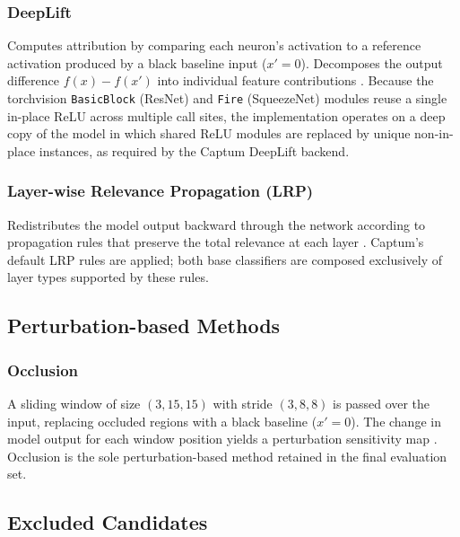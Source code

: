 \subsubsection{DeepLift}
Computes attribution by comparing each neuron's activation to a reference
activation produced by a black baseline input ($x' = 0$). Decomposes the
output difference $f(x) - f(x')$ into individual feature contributions
\cite{shrikumar2017deeplift}. Because the torchvision \texttt{BasicBlock}
(ResNet) and \texttt{Fire} (SqueezeNet) modules reuse a single in-place
ReLU across multiple call sites, the implementation operates on a deep
copy of the model in which shared ReLU modules are replaced by unique
non-in-place instances, as required by the Captum DeepLift backend.

\subsubsection{Layer-wise Relevance Propagation (LRP)}
Redistributes the model output backward through the network according to
propagation rules that preserve the total relevance at each layer
\cite{bach2015lrp}. Captum's default LRP rules are applied; both base
classifiers are composed exclusively of layer types supported by these
rules.

\subsection{Perturbation-based Methods}

\subsubsection{Occlusion}
A sliding window of size $(3, 15, 15)$ with stride $(3, 8, 8)$ is passed
over the input, replacing occluded regions with a black baseline ($x' = 0$).
The change in model output for each window position yields a perturbation
sensitivity map \cite{zeiler2014}. Occlusion is the sole perturbation-based
method retained in the final evaluation set.

\subsection{Excluded Candidates}
\label{subsec:excluded-fae}


